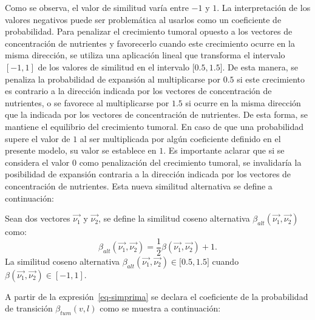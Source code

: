 Como se observa, el valor de similitud varía entre $-1$ y $1$. La interpretación de los valores negativos puede ser problemática al usarlos como un coeficiente de probabilidad. Para penalizar el crecimiento tumoral opuesto a los vectores de concentración de nutrientes y favorecerlo cuando este crecimiento ocurre en la misma dirección, se utiliza una aplicación lineal que transforma el intervalo $[-1,1]$ de los valores de similitud en el intervalo $[0$.$5, 1$.$5]$. De esta manera, se penaliza la probabilidad de expansión al multiplicarse por $0$.$5$ si este crecimiento es contrario a la dirección indicada por los vectores de concentración de nutrientes, o se favorece al multiplicarse por $1$.$5$  si ocurre en la misma dirección que la indicada por los vectores de concentración de nutrientes. De esta forma, se mantiene el equilibrio del crecimiento tumoral. En caso de que una probabilidad supere el valor de $1$ al ser multiplicada por algún coeficiente definido en el presente modelo, su valor se establece en $1$. Es importante aclarar que si se considera el valor $0$ como penalización del crecimiento tumoral, se invalidaría la posibilidad de expansión contraria a la dirección indicada por los vectores de concentración de nutrientes. Esta nueva similitud alternativa se define a continuación:

\begin{definition}
\label{def-simprima}
Sean dos vectores $\overrightarrow{\nu_1}$ y $\overrightarrow{\nu_2}$, se define la similitud coseno alternativa $\beta_{alt}(\overrightarrow{\nu_1},\overrightarrow{\nu_2})$ como:
\begin{equation}
\beta_{alt}(\overrightarrow{\nu_1},\overrightarrow{\nu_2}) = \frac{1}{2} \beta(\overrightarrow{\nu_1},\overrightarrow{\nu_2}) + 1. \label{eq-simprima}
\end{equation}
La similitud coseno alternativa $\beta_{alt}(\overrightarrow{\nu_1},\overrightarrow{\nu_2}) \in [0$.$5, 1$.$5]$ cuando $\beta(\overrightarrow{\nu_1},\overrightarrow{\nu_2}) \in [-1, 1]$. 
\end{definition}

A partir de la expresi\'on~\ref{eq-simprima} se declara el coeficiente de la probabilidad de transici\'on $\beta_{tum}(v,l)$ como se muestra a continuaci\'on:

